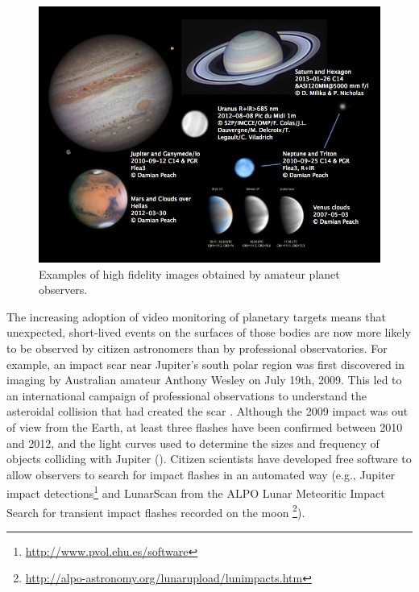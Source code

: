 \documentclass{ar2e}
\begin{document}
\begin{figure}[!ht]
\centering\includegraphics[width=\linewidth]{figs/planets.png}
\caption{Examples of high fidelity images obtained by amateur planet
observers.}
\label{fig:planets}
\end{figure}



The increasing adoption of video monitoring of planetary targets means that
unexpected, short-lived events on the surfaces of those bodies 
are now more likely to be observed by citizen
astronomers than by professional observatories.  For example, an impact scar
near Jupiter's south polar region was first discovered in imaging by Australian
amateur Anthony Wesley on July 19th, 2009. This led to an international campaign
of professional observations to understand the asteroidal collision that had
created the scar \citep[e.g.,][]{10hammel,10depater,11orton}.  Although the 2009
impact was out of view from the Earth, at least three flashes have been
confirmed between 2010 and 2012, and the light curves used to determine the
sizes and frequency of objects colliding with Jupiter \citep[e.g.,][]{10hueso}
().  Citizen scientists have developed free software
to allow observers to search for impact flashes in an automated way (e.g.,
Jupiter impact detections\footnote{\url{http://www.pvol.ehu.es/software}} and
LunarScan from the ALPO Lunar Meteoritic Impact Search for transient impact
flashes recorded on the moon
\footnote{\url{http://alpo-astronomy.org/lunarupload/lunimpacts.htm}}).  
\end{document}
